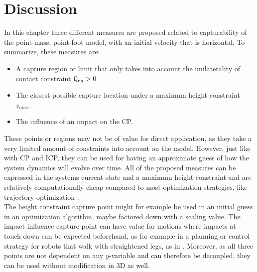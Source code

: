\section{Discussion}
In this chapter three different measures are proposed related to capturability of the point-mass, point-foot model, with an initial velocity that is horizontal. To summarize, these measures are:
\begin{itemize}
	\item A capture region or limit that only takes into account the unilaterality of contact constraint $\mathbf{f}_{leg}>0$.
	\item The closest possible capture location under a maximum height constraint $z_{max}$.
	\item The influence of an impact on the \ac{CP}.
\end{itemize}
These points or regions may not be of value for direct application, as they take a very limited amount of constraints into account on the model. However, just like with \ac{CP} and \ac{ICP}, they can be used for having an approximate guess of how the system dynamics will evolve over time. All of the proposed measures can be expressed in the systems current state and a maximum height constraint and are relatively computationally cheap compared to most optimization strategies, like trajectory optimization \cite{kelly2017introduction}.\\
The height constraint capture point might for example be used in an initial guess in an optimization algorithm, maybe factored down with a scaling value. The impact influence capture point can have value for motions where impacts at touch down can be expected beforehand, as for example in a planning or control strategy for robots that walk with straightened legs, as in \cite{griffin2018straight}. Moreover, as all three points are not dependent on any $y$-variable and can therefore be decoupled, they can be used without modification in \ac{3D} as well.